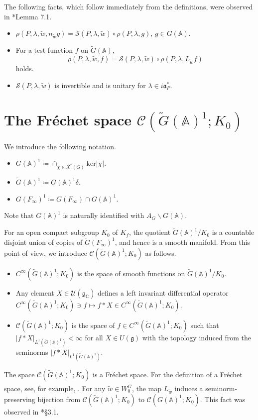\documentclass[12pt]{amsart}
\theoremstyle{definition}
\theoremstyle{plain}
\theoremstyle{remark}
\def\C{\mathbb{C}}%
\def\A{\mathbb{A}}%
\def\inf{\infty}
\def\bs{\backslash}%
\newcommand{\fa}{\mathfrak{a}}
\newcommand{\fg}{\mathfrak{g}}
\newcommand{\cC}{\mathcal{C}}
\newcommand{\cU}{\mathcal{U}}
\newcommand{\sS}{\mathscr{S}}
\numberwithin{equation}{section}
\newcommand{\tG}{\widetilde{G}}
\newcommand{\tw}{\widetilde{w}}
\begin{document}
The following facts, which follow immediately from the definitions, were observed in \cite{Par19}*{Lemma 7.1}.
\begin{itemize}
\item $\rho(P,\lambda,\tw,n_{\tw}g)=\sS(P,\lambda,\tw)\circ \rho(P,\lambda,g)$, $g\in G(\A)$.
\item For a test function $f$ on $\tG(\A)$,
\begin{equation}\label{eq:composition}
\rho(P,\lambda,\tw,f)=\sS(P,\lambda,\tw)\circ \rho(P,\lambda,L_{\tw}f)
\end{equation}
holds.
\item $\sS(P,\lambda,\tw)$ is invertible and is unitary for $\lambda\in i\fa_{P}^*$.
\end{itemize}


\section{The Fr\'echet space \texorpdfstring{$\cC(\tG(\A)^1;K_0)$}{CGK}}\label{sec:Frechet}


We introduce the following notation.
\begin{itemize}
\item $G(\A)^1\coloneqq\cap_{\chi\in X^*(G)} \mathrm{ker}|\chi|$.
\item $\tG(\A)^1\coloneqq G(\A)^1\delta$.
\item $G(F_\inf)^1\coloneqq G(F_\inf)\cap G(\A)^1$.
\end{itemize}
Note that $G(\A)^1$ is naturally identified with $A_G\bs G(\A)$.

For an open compact subgroup $K_0$ of $K_f$, the quotient $\tG(\A)^1/K_0$ is a countable disjoint union of copies of $\tG(F_\inf)^1$, and hence is a smooth manifold.
From this point of view, we introduce $\cC(\tG(\A)^1;K_0)$ as follows.
\begin{itemize}
\item $C^\inf(\tG(\A)^1;K_0)$ is the space of smooth functions on $\tG(\A)^1/K_0$.
\item Any element $X\in\cU(\fg_\C)$ defines a left invariant differential operator $C^\inf(\tG(\A)^1;K_0)\ni f\mapsto f*X \in C^\inf(\tG(\A)^1;K_0)$.
\item $\cC(\tG(\A)^1;K_0)$ is the space of $f\in C^\inf(\tG(\mathbb A)^1;K_0)$ such that $|f*X|_{L^1(\widetilde G(\mathbb A)^1)}<\infty$ for all $X\in U(\mathfrak g)$ with the topology induced from the seminorms $|f*X|_{L^1(\tG(\A)^1)}$.
\end{itemize}
The space $\cC(\tG(\A)^1;K_0)$ is a Fr\'echet space.
For the definition of a Fr\'echet space, see, for example, \cite{SW99}.
For any $\tw\in W^{\tG}_0$, the map $L_{\tw}$ induces a seminorm-preserving bijection from $\cC(\tG(\A)^1;K_0)$ to $\cC(G(\A)^1;K_0)$.
This fact was observed in \cite{Par19}*{\S3.1}.
\end{document}
